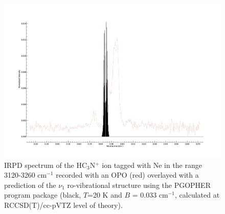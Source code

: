 \begin{figure}
    \centering
    \includegraphics[width=\textwidth,height=\textheight,keepaspectratio]{chapters/HC3N+/figures/spectrum/PGOPHER_HC3N+.pdf}
    \caption{IRPD spectrum of the HC$_3$N$^+$ ion tagged with Ne in the range 3120-3260 cm$^{-1}$ recorded with an OPO (red) overlayed with a prediction of the $\nu_1$ ro-vibrational structure using the PGOPHER program package \cite{western_pgopher_2017} (black, $T$=20 K and $B$ = 0.033 cm$^{-1}$, calculated at RCCSD(T)/cc-pVTZ level of theory).}
    \label{fig:PGopher}
\end{figure}


